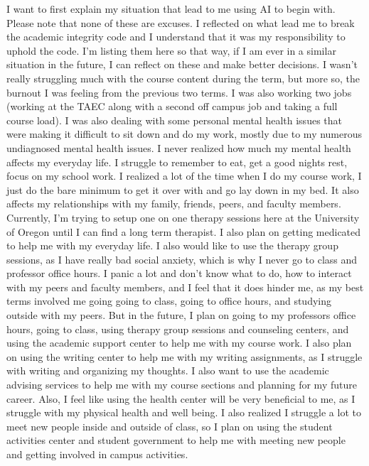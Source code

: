 \documentclass[notitlepage]{report}
\begin{document}
  I want to first explain my situation that lead to me using AI to begin with.
  Please note that none of these are excuses. I reflected on what lead me to
  break the academic integrity code and I understand that it was my
  responsibility to uphold the code. I'm listing them here so that way, if I am
  ever in a similar situation in the future, I can reflect on these and make
  better decisions. I wasn't really struggling much with the course content
  during the term, but more so, the burnout I was feeling from the previous two
  terms. I was also working two jobs (working at the TAEC along with a second
  off campus job and taking a full course load). I was also dealing with some
  personal mental health issues that were making it difficult to sit down and
  do my work, mostly due to my numerous undiagnosed mental health issues. I
  never realized how much my mental health affects my everyday life. I struggle
  to remember to eat, get a good nights rest, focus on my school work. I
  realized a lot of the time when I do my course work, I just do the bare
  minimum to get it over with and go lay down in my bed. It also affects my
  relationships with my family, friends, peers, and faculty members. Currently,
  I'm trying to setup one on one therapy sessions here at the University of
  Oregon until I can find a long term therapist. I also plan on getting
  medicated to help me with my everyday life. I also would like to use the
  therapy group sessions, as I have really bad social anxiety, which is why I
  never go to class and professor office hours. I panic a lot and don't know
  what to do, how to interact with my peers and faculty members, and I feel
  that it does hinder me, as my best terms involved me going going to class,
  going to office hours, and studying outside with my peers. But in the future,
  I plan on going to my professors office hours, going to class, using therapy
  group sessions and counseling centers, and using the academic support center
  to help me with my course work. I also plan on using the writing center to
  help me with my writing assignments, as I struggle with writing and
  organizing my thoughts. I also want to use the academic advising services to
  help me with my course sections and planning for my future career. Also, I
  feel like using the health center will be very beneficial to me, as I
  struggle with my physical health and well being. I also realized I struggle a
  lot to meet new people inside and outside of class, so I plan on using the
  student activities center and student government to help me with meeting new
  people and getting involved in campus activities.
\end{document}
